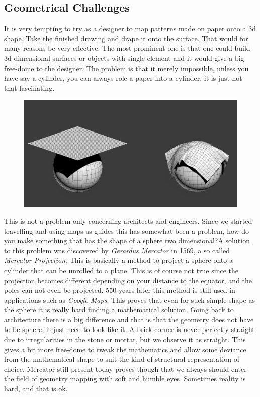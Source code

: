 \subsection{Geometrical Challenges}



It is very tempting to try as a designer to map patterns made on paper onto a 3d shape. Take the finished drawing and drape it onto the surface. That would for many reasons be very effective. The most prominent one is that one could build 3d dimensional surfaces or objects with single element and it would give a big free-dome to the designer. The problem is that it merely impossible, unless you have say a cylinder, you can always role a paper into a cylinder, it is just not that fascinating. 

\begin{figure}[H]
\centering
\includegraphics[width=0.8\linewidth ]{figure/Introduction/drape.jpg}
\caption{}
\end{figure}

This is not a problem only concerning architects and engineers. Since we started travelling and using maps as guides this has somewhat been a problem, how do you make something that has the shape of a sphere two dimensional?A solution to this problem was discovered by  \textit{Gerardus Mercator} in 1569, a so called \textit{Mercator Projection}\cite{ref:merc}. This is basically a method to project a sphere onto a cylinder that can be unrolled to a plane. This is of course not true since the projection becomes different depending on your distance to the equator, and the poles can not even be projected. 550 years later this method is still used in applications such as \textit{Google Maps}\cite{ref:maps}. This proves that even for such simple shape as the sphere it is really hard finding a mathematical solution. Going back to architecture there is a big difference and that is that the geometry does not have to be sphere, it just need to look like it. A brick corner is never perfectly straight due to irregularities in the stone or mortar, but we observe it as straight. This gives a bit more free-dome to tweak the mathematics and allow some deviance from the mathematical shape to suit the kind of structural representation of choice. Mercator still present today proves though that we always should enter the field of geometry mapping with soft and humble eyes. Sometimes reality is hard, and that is ok.

